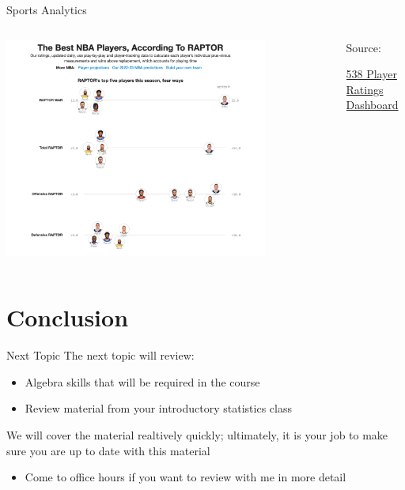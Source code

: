 \documentclass[aspectratio=169,t,11pt,table]{beamer}
\begin{document}
\begin{frame}{Sports Analytics}
  \begin{columns}[T]
    \begin{column}{.7\textwidth}\vspace*{-1.5\bigskipamount}
      \begin{center}
        \includegraphics[width = 0.8\textwidth]{figures/nba_raptor.png}
      \end{center}
    \end{column}
    \begin{column}{.3\textwidth}
      Source:

      \href{https://projects.fivethirtyeight.com/nba-player-ratings/}{538 Player Ratings Dashboard}
    \end{column}
  \end{columns}
\end{frame}



\section*{Conclusion}

\begin{frame}{Next Topic}
  The next topic will review:
  \begin{itemize}
    \item Algebra skills that will be required in the course
    
    \item Review material from your introductory statistics class
  \end{itemize}

  \bigskip
  We will cover the material realtively quickly; ultimately, it is your job to make sure you are up to date with this material
  \begin{itemize}
    \item Come to office hours if you want to review with me in more detail
  \end{itemize}
\end{frame}
\end{document}
